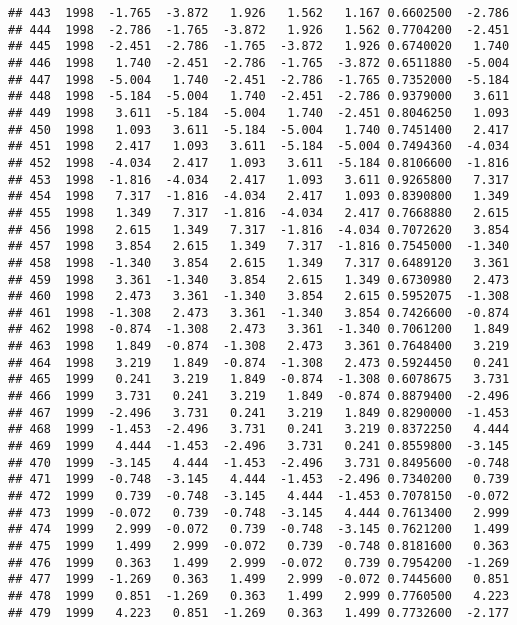 \documentclass[]{article}
\begin{document}
\begin{verbatim}
## 443  1998  -1.765  -3.872   1.926   1.562   1.167 0.6602500  -2.786
## 444  1998  -2.786  -1.765  -3.872   1.926   1.562 0.7704200  -2.451
## 445  1998  -2.451  -2.786  -1.765  -3.872   1.926 0.6740020   1.740
## 446  1998   1.740  -2.451  -2.786  -1.765  -3.872 0.6511880  -5.004
## 447  1998  -5.004   1.740  -2.451  -2.786  -1.765 0.7352000  -5.184
## 448  1998  -5.184  -5.004   1.740  -2.451  -2.786 0.9379000   3.611
## 449  1998   3.611  -5.184  -5.004   1.740  -2.451 0.8046250   1.093
## 450  1998   1.093   3.611  -5.184  -5.004   1.740 0.7451400   2.417
## 451  1998   2.417   1.093   3.611  -5.184  -5.004 0.7494360  -4.034
## 452  1998  -4.034   2.417   1.093   3.611  -5.184 0.8106600  -1.816
## 453  1998  -1.816  -4.034   2.417   1.093   3.611 0.9265800   7.317
## 454  1998   7.317  -1.816  -4.034   2.417   1.093 0.8390800   1.349
## 455  1998   1.349   7.317  -1.816  -4.034   2.417 0.7668880   2.615
## 456  1998   2.615   1.349   7.317  -1.816  -4.034 0.7072620   3.854
## 457  1998   3.854   2.615   1.349   7.317  -1.816 0.7545000  -1.340
## 458  1998  -1.340   3.854   2.615   1.349   7.317 0.6489120   3.361
## 459  1998   3.361  -1.340   3.854   2.615   1.349 0.6730980   2.473
## 460  1998   2.473   3.361  -1.340   3.854   2.615 0.5952075  -1.308
## 461  1998  -1.308   2.473   3.361  -1.340   3.854 0.7426600  -0.874
## 462  1998  -0.874  -1.308   2.473   3.361  -1.340 0.7061200   1.849
## 463  1998   1.849  -0.874  -1.308   2.473   3.361 0.7648400   3.219
## 464  1998   3.219   1.849  -0.874  -1.308   2.473 0.5924450   0.241
## 465  1999   0.241   3.219   1.849  -0.874  -1.308 0.6078675   3.731
## 466  1999   3.731   0.241   3.219   1.849  -0.874 0.8879400  -2.496
## 467  1999  -2.496   3.731   0.241   3.219   1.849 0.8290000  -1.453
## 468  1999  -1.453  -2.496   3.731   0.241   3.219 0.8372250   4.444
## 469  1999   4.444  -1.453  -2.496   3.731   0.241 0.8559800  -3.145
## 470  1999  -3.145   4.444  -1.453  -2.496   3.731 0.8495600  -0.748
## 471  1999  -0.748  -3.145   4.444  -1.453  -2.496 0.7340200   0.739
## 472  1999   0.739  -0.748  -3.145   4.444  -1.453 0.7078150  -0.072
## 473  1999  -0.072   0.739  -0.748  -3.145   4.444 0.7613400   2.999
## 474  1999   2.999  -0.072   0.739  -0.748  -3.145 0.7621200   1.499
## 475  1999   1.499   2.999  -0.072   0.739  -0.748 0.8181600   0.363
## 476  1999   0.363   1.499   2.999  -0.072   0.739 0.7954200  -1.269
## 477  1999  -1.269   0.363   1.499   2.999  -0.072 0.7445600   0.851
## 478  1999   0.851  -1.269   0.363   1.499   2.999 0.7760500   4.223
## 479  1999   4.223   0.851  -1.269   0.363   1.499 0.7732600  -2.177

\end{verbatim}
\end{document}
